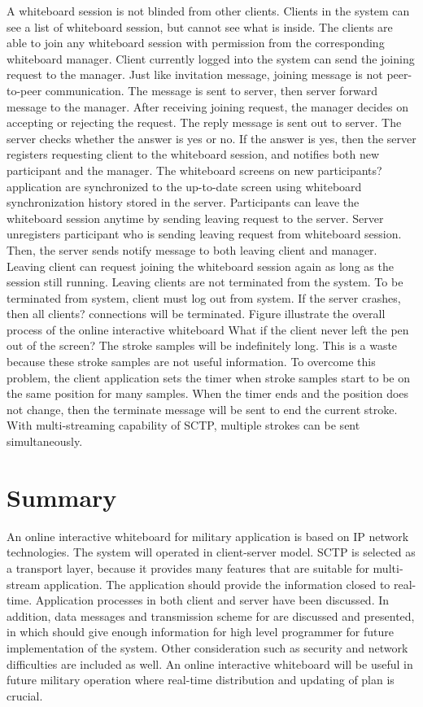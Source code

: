 \documentclass[conference]{IEEEtran}
\begin{document}
A whiteboard session is not blinded from other clients. Clients in the system can see a list of whiteboard session, but cannot see what is inside. The clients are able to join any whiteboard session with permission from the corresponding whiteboard manager. Client currently logged into the system can send the joining request to the manager. Just like invitation message, joining message is not peer-to-peer communication. The message is sent to server, then server forward message to the manager. After receiving joining request, the manager decides on accepting or rejecting the request. The reply message is sent out to server. The server checks whether the answer is yes or no. If the answer is yes, then the server registers requesting client to the whiteboard session, and notifies both new participant and the manager. The whiteboard screens on new participants? application are synchronized to the up-to-date screen using whiteboard synchronization history stored in the server.
Participants can leave the whiteboard session anytime by sending leaving request to the server. Server unregisters participant who is sending leaving request from whiteboard session. Then, the server sends notify message to both leaving client and manager. Leaving client can request joining the whiteboard session again as long as the session still running. Leaving clients are not terminated from the system. To be terminated from system, client must log out from system. If the server crashes, then all clients? connections will be terminated. Figure  illustrate the overall process of the online interactive whiteboard
   What if the client never left the pen out of the screen? The stroke samples will be indefinitely long. This is a waste because these stroke samples are not useful information. To overcome this problem, the client application sets the timer when stroke samples start to be on the same position for many samples. When the timer ends and the position does not change, then the terminate message will be sent to end the current stroke. With multi-streaming capability of SCTP, multiple strokes can be sent simultaneously.

\section{Summary}
An online interactive whiteboard for military application is based on IP network technologies. The system will operated in client-server model. SCTP is selected as a transport layer, because it provides many features that are suitable for multi-stream application. The application should provide the information closed to real-time. Application processes in both client and server have been discussed. In addition, data messages and transmission scheme for are discussed and presented, in which should give enough information for high level programmer for future implementation of the system. Other consideration such as security and network difficulties are included as well. An online interactive whiteboard will be useful in future military operation where real-time distribution and updating of plan is crucial.
\end{document}
